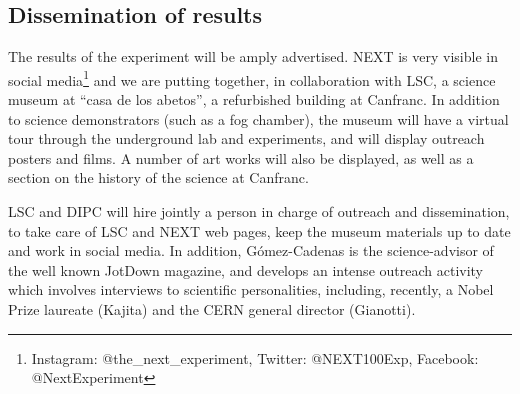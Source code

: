 
\subsection{Dissemination of results}

The results of the experiment will be amply advertised. NEXT is very visible in social media\footnote{Instagram: @the\_next\_experiment,
Twitter: @NEXT100Exp,
Facebook: @NextExperiment} and we are putting together, in collaboration with LSC, a science museum at ``casa de los abetos'', a refurbished building at Canfranc. In addition to science demonstrators (such as a fog chamber), the museum will have a virtual tour through the underground lab and experiments, and will display outreach posters and films. A number of art works will also be displayed, as well as a section on the history of the science at Canfranc. 


LSC and DIPC will hire jointly a person in charge of outreach and dissemination, to take care of LSC and NEXT web pages, keep the museum materials up to date and work in social media. In addition, G\'omez-Cadenas
is the science-advisor of the well known JotDown magazine, and develops an intense outreach activity which involves interviews to scientific personalities, including, recently, a Nobel Prize laureate (Kajita) and the CERN general director (Gianotti).

%

